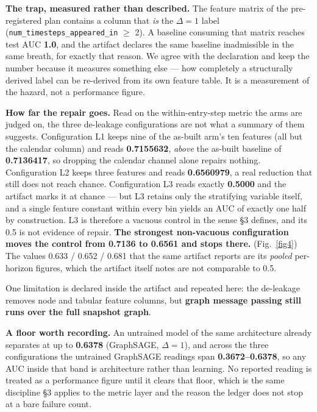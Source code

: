 \textbf{The trap, measured rather than described.} The feature matrix of the
pre-registered plan contains a column that \emph{is} the $\Delta = 1$ label
(\texttt{num\_timesteps\_appeared\_in} $\geq$ 2). A baseline consuming that
matrix reaches test AUC \textbf{1.0}, and the artifact declares the same baseline
inadmissible in the same breath, for exactly that reason. We agree with the
declaration and keep the number because it measures something else --- how
completely a structurally derived label can be re-derived from its own feature
table. It is a measurement of the hazard, not a performance figure.

\textbf{How far the repair goes.} Read on the within-entry-step metric the arms
are judged on, the three de-leakage configurations are not what a summary of
them suggests. Configuration L1 keeps nine of the as-built arm's ten features
(all but the calendar column) and reads \textbf{0.7155632}, \emph{above} the
as-built baseline of \textbf{0.7136417}, so dropping the calendar channel alone
repairs nothing. Configuration L2 keeps three features and reads
\textbf{0.6560979}, a real reduction that still does not reach chance.
Configuration L3 reads exactly \textbf{0.5000} and the artifact marks it at
chance --- but L3 retains only the stratifying variable itself, and a single
feature constant within every bin yields an AUC of exactly one half by
construction. L3 is therefore a vacuous control in the sense \S3 defines, and its
0.5 is not evidence of repair. \textbf{The strongest non-vacuous configuration moves
the control from 0.7136 to 0.6561 and stops there.} (Fig.~\ref{fig4}) The values 0.633 / 0.652 /
0.681 that the same artifact reports are its \emph{pooled} per-horizon figures,
which the artifact itself notes are not comparable to 0.5.

One limitation is declared inside the artifact and repeated here: the
de-leakage removes node and
tabular feature columns, but \textbf{graph message passing still runs over the
full snapshot graph}.

\textbf{A floor worth recording.} An untrained model of the same architecture
already separates at up to \textbf{0.6378} (GraphSAGE, $\Delta = 1$), and across
the three configurations the untrained GraphSAGE readings span
\textbf{0.3672--0.6378}, so any AUC inside that band is architecture rather than
learning. No reported reading is treated as a performance figure until it clears
that floor, which is the same discipline \S3 applies to the metric layer and the
reason the ledger does not stop at a bare failure count.

